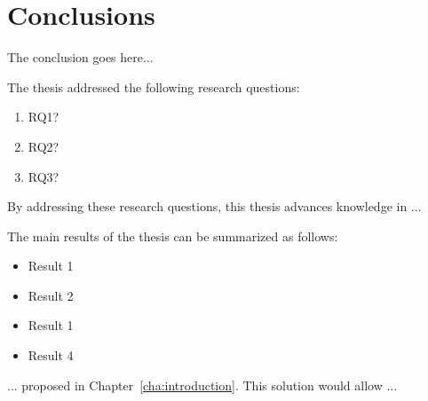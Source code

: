 \chapter{Conclusions}
\label{cha:conclusions}
\vspace{0.4 cm}

The conclusion goes here...

The thesis addressed the following research questions:
\begin{enumerate}
  \item RQ1?
  \item RQ2?
  \item RQ3?
\end{enumerate}
By addressing these research questions, this thesis advances knowledge in ...

The main results of the thesis can be summarized as follows:
\begin{itemize}
  \item Result 1
  \item Result 2
  \item Result 1
  \item Result 4
\end{itemize}

... proposed in Chapter~\ref{cha:introduction}. This solution would allow ...
